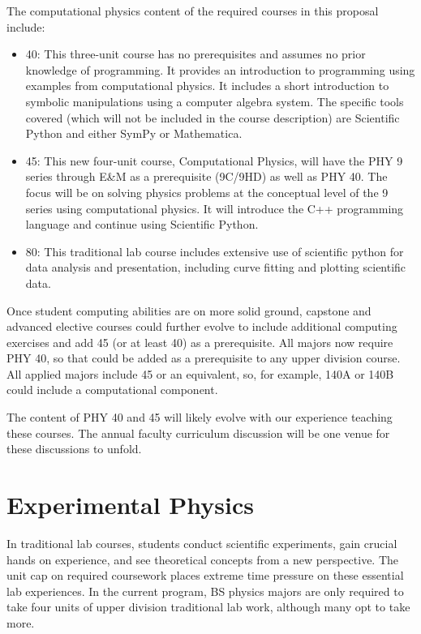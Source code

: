 \documentclass[12pt]{article}
\begin{document}
The computational physics content of the required courses in this
proposal include:
\begin{itemize}
\item 40: This three-unit course has no prerequisites and assumes no
  prior knowledge of programming.  It provides an introduction to
  programming using examples from computational physics.  It includes
  a short introduction to symbolic manipulations using a computer
  algebra system.  The specific tools covered (which will not be
  included in the course description) are Scientific Python and either
  SymPy or Mathematica.

\item 45: This new four-unit course, Computational Physics, will have
  the PHY 9 series through E\&M as a prerequisite (9C/9HD) as well as
  PHY 40.  The focus will be on solving physics problems at the
  conceptual level of the 9 series using computational physics.  It
  will introduce the C++ programming language and continue using
  Scientific Python.
  
\item 80: This traditional lab course includes extensive use of
  scientific python for data analysis and presentation, including
  curve fitting and plotting scientific data.
  
\end{itemize}
Once student computing abilities are on more solid
ground, capstone and advanced elective courses could further evolve to
include additional computing exercises and add 45 (or at least 40) as
a prerequisite.  All majors now require PHY 40, so that could be added
as a prerequisite to any upper division course.  All applied majors
include 45 or an equivalent, so, for example, 140A or 140B could include
a computational component.

The content of PHY 40 and 45 will likely evolve with our
experience teaching these courses.  The annual faculty curriculum discussion will be one venue for these
discussions to unfold.

\section{Experimental Physics}
\label{sec:labs}

In traditional lab courses, students conduct scientific experiments,
gain crucial hands on experience, and see theoretical concepts from a
new perspective.  The unit cap on required coursework places extreme
time pressure on these essential lab experiences. In the current
program, BS physics majors are only required to take four units of
upper division traditional lab work, although many opt to take more.
\end{document}

